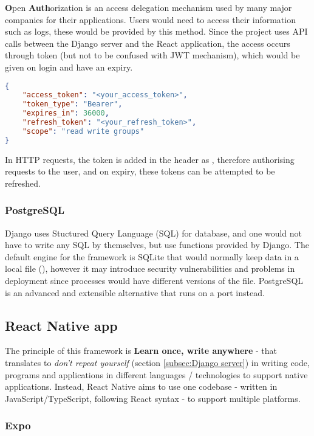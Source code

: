 \documentclass[../main.tex]{subfiles}
\begin{document}
\textbf{O}pen \textbf{Auth}orization is an access delegation mechanism used by many major companies for their applications. Users would need to access their information such as logs, these would be provided by this method. Since the project uses API calls between the Django server and the React application, the access occurs through token (but not to be confused with JWT mechanism), which would be given on login and have an expiry.

\begin{lstlisting}[language=json, caption={Example of a web access token}]
{
    "access_token": "<your_access_token>",
    "token_type": "Bearer",
    "expires_in": 36000,
    "refresh_token": "<your_refresh_token>",
    "scope": "read write groups"
}
\end{lstlisting}

In HTTP requests, the token is added in the header as , therefore authorising requests to the user, and on expiry, these tokens can be attempted to be refreshed.

\subsubsection{PostgreSQL}

Django uses Stuctured Query Language (SQL) for database, and one would not have to write any SQL by themselves, but use functions provided by Django. The default engine for the framework is SQLite that would normally keep data in a local file (), however it may introduce security vulnerabilities and problems in deployment since processes would have different versions of the file. PostgreSQL is an advanced and extensible alternative that runs on a port instead.

\subsection{React Native app}

The principle of this framework is \textbf{Learn once, write anywhere} - that translates to \textit{don't repeat yourself} (section \ref{subsec:Django server}) in writing code, programs and applications in different languages / technologies to support native applications. Instead, React Native aims to use one codebase - written in JavaScript/TypeScript, following React syntax - to support multiple platforms.

\subsubsection{Expo}
\end{document}
